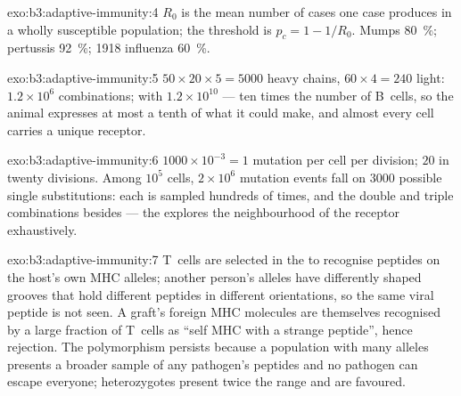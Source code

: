 \begin{solution}{exo:b3:adaptive-immunity:4}
$R_{0}$ is the mean number of cases one case produces in a wholly
susceptible population; the threshold is $p_{c} = 1 - 1/R_{0}$. Mumps
\qty{80}{\%}; pertussis \qty{92}{\%}; 1918 influenza \qty{60}{\%}.
\end{solution}

\begin{solution}{exo:b3:adaptive-immunity:5}
$50\times 20\times 5 = 5000$ heavy chains, $60\times 4 = 240$ light:
$1.2\times 10^{6}$ combinations; with  $1.2\times
10^{10}$ --- ten times the number of B~cells, so the animal expresses
at most a tenth of what it could make, and almost every cell carries a
unique receptor.
\end{solution}

\begin{solution}{exo:b3:adaptive-immunity:6}
$1000\times 10^{-3} = 1$ mutation per cell per division; $20$ in twenty
divisions. Among $10^{5}$ cells, $2\times 10^{6}$ mutation events fall
on $3000$ possible single substitutions: each is sampled hundreds of
times, and the double and triple combinations besides --- the  explores the neighbourhood of the receptor exhaustively.
\end{solution}

\begin{solution}{exo:b3:adaptive-immunity:7}
T~cells are selected in the  to recognise peptides on the host's
own MHC alleles; another person's alleles have differently shaped
grooves that hold different peptides in different orientations, so the
same viral peptide is not seen. A graft's foreign MHC molecules are
themselves recognised by a large fraction of T~cells as ``self MHC with
a strange peptide'', hence rejection. The polymorphism persists because
a population with many alleles presents a broader sample of any
pathogen's peptides and no pathogen can escape everyone; heterozygotes
present twice the range and are favoured.
\end{solution}

